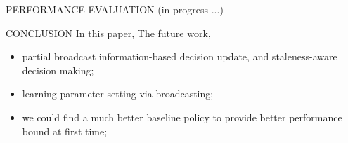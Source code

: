 \documentclass[10pt, conference, letterpaper]{IEEEtran}
\begin{document}
    \begin{section}{PERFORMANCE EVALUATION}
        \label{sec:evaluation}
        (in progress ...)
    \end{section}

    \begin{section}{CONCLUSION}
        \label{sec:conclusion}
        In this paper,
        The future work,
        \begin{itemize}
            \item partial broadcast information-based decision update, and staleness-aware decision making;
            \item learning parameter setting via broadcasting;
            \item we could find a much better baseline policy to provide better performance bound at first time;
        \end{itemize}
    \end{section}
    
    \appendices
\end{document}
